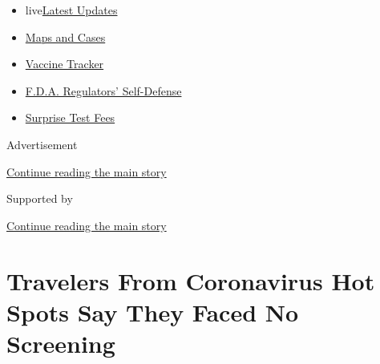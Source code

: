 \begin{itemize}
\tightlist
\item
  live\href{https://www.nytimes3xbfgragh.onion/2020/09/11/world/covid-19-coronavirus.html?name=styln-coronavirus-national\&region=TOP_BANNER\&block=storyline_menu_recirc\&action=click\&pgtype=Article\&impression_id=9c4383f1-f4c0-11ea-bc13-db3a9dba292a\&variant=undefined}{Latest
  Updates}
\item
  \href{https://www.nytimes3xbfgragh.onion/interactive/2020/us/coronavirus-us-cases.html?name=styln-coronavirus-national\&region=TOP_BANNER\&block=storyline_menu_recirc\&action=click\&pgtype=Article\&impression_id=9c4383f2-f4c0-11ea-bc13-db3a9dba292a\&variant=undefined}{Maps
  and Cases}
\item
  \href{https://www.nytimes3xbfgragh.onion/interactive/2020/science/coronavirus-vaccine-tracker.html?name=styln-coronavirus-national\&region=TOP_BANNER\&block=storyline_menu_recirc\&action=click\&pgtype=Article\&impression_id=9c4383f3-f4c0-11ea-bc13-db3a9dba292a\&variant=undefined}{Vaccine
  Tracker}
\item
  \href{https://www.nytimes3xbfgragh.onion/2020/09/10/us/politics/fda-coronavirus-vaccine.html?name=styln-coronavirus-national\&region=TOP_BANNER\&block=storyline_menu_recirc\&action=click\&pgtype=Article\&impression_id=9c4383f4-f4c0-11ea-bc13-db3a9dba292a\&variant=undefined}{F.D.A.
  Regulators' Self-Defense}
\item
  \href{https://www.nytimes3xbfgragh.onion/2020/09/09/upshot/coronavirus-surprise-test-fees.html?name=styln-coronavirus-national\&region=TOP_BANNER\&block=storyline_menu_recirc\&action=click\&pgtype=Article\&impression_id=9c4383f5-f4c0-11ea-bc13-db3a9dba292a\&variant=undefined}{Surprise
  Test Fees}
\end{itemize}

Advertisement

\protect\hyperlink{after-top}{Continue reading the main story}

Supported by

\protect\hyperlink{after-sponsor}{Continue reading the main story}

\hypertarget{travelers-from-coronavirus-hot-spots-say-they-faced-no-screening}{%
\section{Travelers From Coronavirus Hot Spots Say They Faced No
Screening}\label{travelers-from-coronavirus-hot-spots-say-they-faced-no-screening}}

